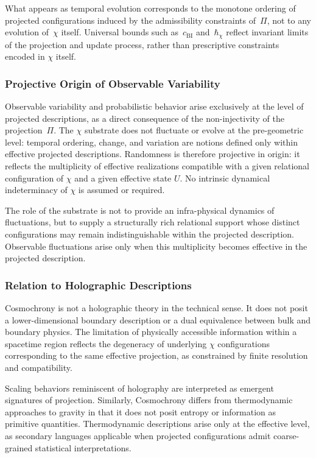     What appears as temporal evolution corresponds to the monotone ordering of
    projected configurations induced by the admissibility constraints of~$\Pi$,
    not to any evolution of~$\chi$ itself.
    Universal bounds such as~$c_{\mathrm{BI}}$ and~$\hbar_\chi$ reflect invariant limits
    of the projection and update process, rather than prescriptive constraints
    encoded in $\chi$ itself.

  \subsubsection*{Projective Origin of Observable Variability}
    \label{subsubsec:intrinsic-structural-indeterminacy}
    Observable variability and probabilistic behavior arise exclusively at the level of
    projected descriptions, as a direct consequence of the non-injectivity of the
    projection~$\Pi$.
    The $\chi$ substrate does not fluctuate or evolve at the pre-geometric level:
    temporal ordering, change, and variation are notions defined only within effective
    projected descriptions.
    Randomness is therefore projective in origin: it reflects the multiplicity of effective
    realizations compatible with a given relational configuration of $\chi$ and a given
    effective state $U$.
    No intrinsic dynamical indeterminacy of $\chi$ is assumed or required.

    The role of the substrate is not to provide an infra-physical dynamics of fluctuations,
    but to supply a structurally rich relational support whose distinct configurations may
    remain indistinguishable within the projected description.
    Observable fluctuations arise only when this multiplicity becomes effective in the
    projected description.

  \subsubsection*{Relation to Holographic Descriptions}
    \label{subsubsec:clarifying-holography}

    Cosmochrony is not a holographic theory in the technical sense.
    It does not posit a lower-dimensional boundary description or a dual
    equivalence between bulk and boundary physics.
    The limitation of physically accessible information within a spacetime
    region reflects the degeneracy of underlying $\chi$ configurations
    corresponding to the same effective projection, as constrained by finite
    resolution and compatibility.

    Scaling behaviors reminiscent of holography are interpreted as emergent
    signatures of projection.
    Similarly, Cosmochrony differs from thermodynamic approaches to gravity in
    that it does not posit entropy or information as primitive quantities.
    Thermodynamic descriptions arise only at the effective level, as secondary
    languages applicable when projected configurations admit coarse-grained
    statistical interpretations.
